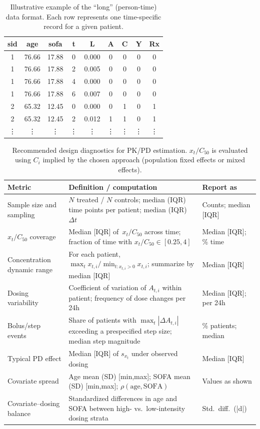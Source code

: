 \begin{table}[ht!]
\centering
\caption{Illustrative example of the ``long'' (person-time) data format. Each row represents one time-specific record for a given patient.}
\label{tab:long_format_example}
\begin{tabular}{ccccccccc}
\toprule
\textbf{sid} & \textbf{age} & \textbf{sofa} & \textbf{t} & \textbf{L} & \textbf{A} & \textbf{C} & \textbf{Y} & \textbf{Rx} \\
\midrule
1 & 76.66 & 17.88 & 0 & 0.000 & 0 & 0 & 0 & 0 \\
1 & 76.66 & 17.88 & 2 & 0.005 & 0 & 0 & 0 & 0 \\
1 & 76.66 & 17.88 & 4 & 0.000 & 0 & 0 & 0 & 0 \\
1 & 76.66 & 17.88 & 6 & 0.007 & 0 & 0 & 0 & 0 \\
2 & 65.32 & 12.45 & 0 & 0.000 & 0 & 1 & 0 & 1 \\
2 & 65.32 & 12.45 & 2 & 0.012 & 1 & 1 & 0 & 1 \\
\vdots & \vdots & \vdots & \vdots & \vdots & \vdots & \vdots & \vdots & \vdots \\
\bottomrule
\end{tabular}
\end{table}

\begin{table}[t]
\centering
\caption{Recommended design diagnostics for PK/PD estimation. $x_t/C_{50}$ is evaluated using $C_i$ implied by the chosen approach (population fixed effects or mixed effects).}
\label{tab:design}
\begin{tabular}{p{3.4cm} p{7.8cm} p{3.4cm}}
\toprule
\textbf{Metric} & \textbf{Definition / computation} & \textbf{Report as} \\
\midrule
Sample size and sampling & $N$ treated / $N$ controls; median (IQR) time points per patient; median (IQR) $\Delta t$ & Counts; median [IQR] \\
$x_t/C_{50}$ coverage & Median [IQR] of $\,x_{t}/C_{50}$ across time; fraction of time with $x_t/C_{50}\in[0.25,4]$ & Median [IQR]; \% time \\
Concentration dynamic range & For each patient, $\max_t x_{t,i}/\min_{t:x_{t,i}>0} x_{t,i}$; summarize by median [IQR] & Median [IQR] \\
Dosing variability & Coefficient of variation of $A_{t,i}$ within patient; frequency of dose changes per 24h & Median [IQR]; per 24h \\
Bolus/step events & Share of patients with $\max_t |\Delta A_{t,i}|$ exceeding a prespecified step size; median step magnitude & \% patients; median \\
Typical PD effect & Median [IQR] of $s_{x_t}$ under observed dosing & Median [IQR] \\
Covariate spread & Age mean (SD) [min,max]; SOFA mean (SD) [min,max]; $\rho(\text{age},\text{SOFA})$ & Values as shown \\
Covariate--dosing balance & Standardized differences in age and SOFA between high- vs.\ low-intensity dosing strata & Std.\ diff.\ (|d|) \\
\bottomrule
\end{tabular}
\end{table}